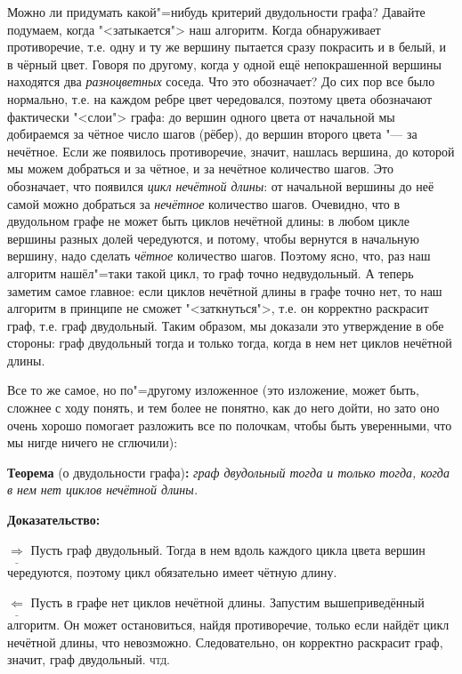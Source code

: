 Можно ли придумать какой"=нибудь критерий двудольности графа? Давайте подумаем, когда 
"<затыкается"> наш алгоритм. Когда обнаруживает противоречие, т.е. одну и ту же вершину пытается 
сразу покрасить и в белый, и в чёрный цвет. Говоря по другому, когда у одной ещё непокрашенной 
вершины находятся два \textit{разноцветных} соседа. Что это обозначает? До сих пор все было 
нормально, т.е. на каждом ребре цвет чередовался, поэтому цвета обозначают фактически "<слои"> 
графа: до вершин одного цвета от начальной мы добираемся за чётное число шагов (рёбер), до вершин второго 
цвета "--- за нечётное. Если же появилось противоречие, значит, нашлась вершина, до которой мы 
можем добраться и за чётное, и за нечётное количество шагов. Это обозначает, что появился 
\textit{цикл нечётной длины}: от начальной вершины до неё самой можно добраться за \textit{нечётное} 
количество шагов. Очевидно, что в двудольном графе не может быть циклов нечётной длины: в любом 
цикле вершины разных долей чередуются, и потому, чтобы вернутся в начальную вершину, надо сделать 
\textit{чётное} количество шагов. Поэтому ясно, что, раз наш алгоритм нашёл"=таки такой цикл, то 
граф точно недвудольный. А теперь заметим самое главное: если циклов нечётной длины в графе точно 
нет, то наш алгоритм в принципе не сможет "<заткнуться">, т.е. он корректно раскрасит граф, т.е. 
граф двудольный. Таким образом, мы доказали это утверждение в обе стороны: граф двудольный тогда и 
только тогда, когда в нем нет циклов нечётной длины.

Все то же самое, но по"=другому изложенное (это изложение, может быть, сложнее с ходу понять, и тем 
более не понятно, как до него дойти, но зато оно очень хорошо помогает разложить все по полочкам, 
чтобы быть уверенными, что мы нигде ничего не сглючили):

\textbf{Теорема} (о двудольности графа)\textbf{:} \textit{граф двудольный тогда и только тогда, когда в нем 
нет циклов нечётной длины.}

\textbf{Доказательство:}

$\underline{\Rightarrow}$ Пусть граф двудольный. Тогда в нем вдоль каждого цикла цвета вершин 
чередуются, поэтому цикл обязательно имеет чётную длину.

$\underline{\Leftarrow}$ Пусть в графе нет циклов нечётной длины. Запустим вышеприведённый 
алгоритм. Он может остановиться, найдя противоречие, только если найдёт цикл нечётной длины, что 
невозможно. Следовательно, он корректно раскрасит граф, значит, граф двудольный. \textsc{чтд.}

